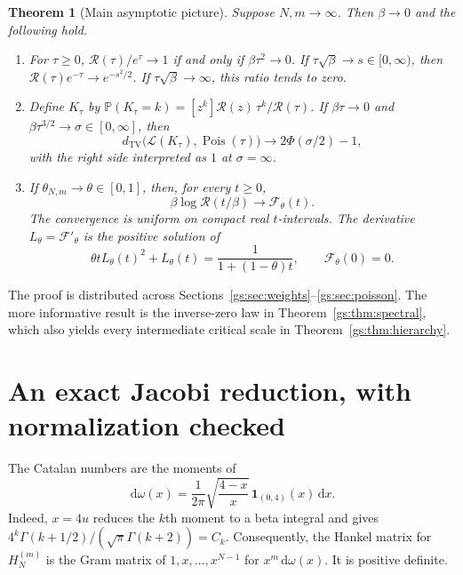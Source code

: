 \documentclass[11pt,a4paper]{article}
\numberwithin{equation}{section}
\newtheorem{theorem}{Theorem}[section]
\theoremstyle{definition}
\theoremstyle{remark}
\newcommand{\dd}{\mathrm d}
\newcommand{\Rgs}{\mathcal R}
\newcommand{\PP}{\mathbb P}
\newcommand{\Pois}{\operatorname{Pois}}
\newcommand{\TV}{d_{\mathrm{TV}}}
\newcommand{\Law}{\mathcal L}
\newcommand{\calF}{\mathcal F}
\begin{document}
\begin{theorem}[Main asymptotic picture]\label{gs:thm:overview}
Suppose $N,m\to\infty$. Then $\beta\to0$ and the following hold.
\begin{enumerate}[label=\textup{(\roman*)},leftmargin=8mm]
\item For $\tau\ge0$,
$\Rgs(\tau)/e^\tau\to1$ if and only if $\beta\tau^2\to0$.
If $\tau\sqrt\beta\to s\in[0,\infty)$, then
$\Rgs(\tau)e^{-\tau}\to e^{-s^2/2}$.
If $\tau\sqrt\beta\to\infty$, this ratio tends to zero.
\item Define $K_\tau$ by
$\PP(K_\tau=k)=[z^k]\Rgs(z)\,\tau^k/\Rgs(\tau)$.
If $\beta\tau\to0$ and $\beta\tau^{3/2}\to\sigma\in[0,\infty]$, then
\begin{equation}\label{gs:eq:TV-main}
 \TV\bigl(\Law(K_\tau),\Pois(\tau)\bigr)
 \longrightarrow 2\Phi(\sigma/2)-1,
\end{equation}
with the right side interpreted as $1$ at $\sigma=\infty$.
\item If $\theta_{N,m}\to\theta\in[0,1]$, then, for every $t\ge0$,
\begin{equation}\label{gs:eq:free-overview}
 \beta\log\Rgs(t/\beta)\longrightarrow\calF_\theta(t).
\end{equation}
The convergence is uniform on compact real $t$-intervals. The derivative
$L_\theta=\calF'_\theta$ is the positive solution of
\begin{equation}\label{gs:eq:algebraic-overview}
 \theta tL_\theta(t)^2+L_\theta(t)
       =\frac1{1+(1-\theta)t},\qquad \calF_\theta(0)=0.
\end{equation}
\end{enumerate}
\end{theorem}

The proof is distributed across Sections~\ref{gs:sec:weights}--\ref{gs:sec:poisson}.
The more informative result is the inverse-zero law in
Theorem~\ref{gs:thm:spectral}, which also yields every intermediate critical
scale in Theorem~\ref{gs:thm:hierarchy}.

\section{An exact Jacobi reduction, with normalization checked}
\label{gs:sec:jacobi}

The Catalan numbers are the moments of
\begin{equation}\label{gs:eq:measure}
 \,\dd\omega(x)=\frac1{2\pi}\sqrt{\frac{4-x}{x}}\,
             \mathbf1_{(0,4)}(x)\,\dd x.
\end{equation}
Indeed, $x=4u$ reduces the $k$th moment to a beta integral and gives
$4^k\Gamma(k+1/2)/(\sqrt\pi\Gamma(k+2))=C_k$.
Consequently, the Hankel matrix for $H_N^{(m)}$ is the Gram matrix of
$1,x,\ldots,x^{N-1}$ for $x^m\,\dd\omega(x)$. It is positive definite.
\end{document}
